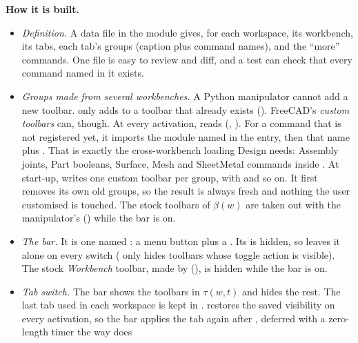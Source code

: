 \textbf{How it is built.}
\begin{itemize}[nosep]
  \item \emph{Definition.} A data file  in the module gives, for each workspace, its workbench, its
        tabs, each tab's groups (caption plus command names), and the ``more'' commands. One file is easy to
        review and diff, and a test can check that every command named in it exists.
  \item \emph{Groups made from several workbenches.} A Python manipulator cannot add a new toolbar.
         only adds to a toolbar that already exists ().
        FreeCAD's \emph{custom toolbars} can, though. At every activation,  reads
         (, ). For a command
        that is not registered yet, it imports the module named in the entry, then that name plus
        . That is exactly the cross-workbench loading Design needs: Assembly joints, Part booleans,
        Surface, Mesh and SheetMetal commands inside . At start-up,
         writes one custom toolbar per group,  with
         and so on. It first removes its own old  groups, so the result is
        always fresh and nothing the user customised is touched. The stock toolbars of $\beta(w)$ are taken
        out with the manipulator's  () while the
        bar is on.
  \item \emph{The bar.} It is one  named : a menu button plus a
        . Its  is hidden, so  leaves it alone
        on every switch ( only hides toolbars whose toggle action is
        visible). The stock \emph{Workbench} toolbar, made by 
        (), is hidden while the bar is on.
  \item \emph{Tab switch.} The bar shows the toolbars in $\tau(w,t)$ and hides the rest. The last tab used in
        each workspace is kept in .  restores the
        saved visibility on every activation, so the bar applies the tab again after
        , deferred with a zero-length timer the way  does

\end{itemize}
